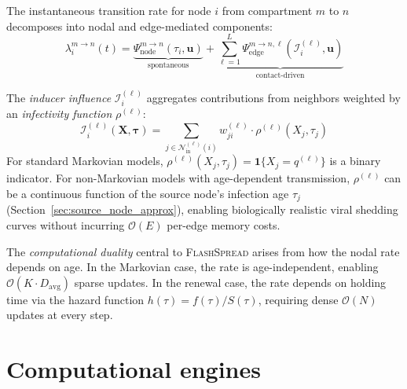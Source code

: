\documentclass[a4paper,fleqn]{cas-sc}
\theoremstyle{definition}
\theoremstyle{remark}
\newcommand{\flashspread}{\textsc{FlashSpread}}
\newcommand{\bigO}{\mathcal{O}}
\begin{document}
The instantaneous transition rate for node $i$ from compartment $m$ to $n$ decomposes into nodal and edge-mediated components:
\begin{equation}
    \lambda_{i}^{m \to n}(t) = \underbrace{\Psi_{\text{node}}^{m \to n}(\tau_i, \mathbf{u})}_{\text{spontaneous}} + \underbrace{\sum_{\ell=1}^{L} \Psi_{\text{edge}}^{m \to n, \ell}\left(\mathcal{I}_i^{(\ell)}, \mathbf{u}\right)}_{\text{contact-driven}}
    \label{eq:general_rate}
\end{equation}

The \emph{inducer influence} $\mathcal{I}_i^{(\ell)}$ aggregates contributions from neighbors weighted by an \emph{infectivity function} $\rho^{(\ell)}$:
\begin{equation}
    \mathcal{I}_i^{(\ell)}(\mathbf{X}, \bm{\tau}) = \sum_{j \in \mathcal{N}_{\text{in}}^{(\ell)}(i)} w_{ji}^{(\ell)} \cdot \rho^{(\ell)}(X_j, \tau_j)
    \label{eq:influence}
\end{equation}
For standard Markovian models, $\rho^{(\ell)}(X_j, \tau_j) = \mathbf{1}\{X_j = q^{(\ell)}\}$ is a binary indicator. For non-Markovian models with age-dependent transmission, $\rho^{(\ell)}$ can be a continuous function of the source node's infection age $\tau_j$ (Section~\ref{sec:source_node_approx}), enabling biologically realistic viral shedding curves without incurring $\bigO(E)$ per-edge memory costs.

The \emph{computational duality} central to \flashspread{} arises from how the nodal rate depends on age. In the Markovian case, the rate is age-independent, enabling $\bigO(K \cdot D_{\text{avg}})$ sparse updates. In the renewal case, the rate depends on holding time via the hazard function $h(\tau) = f(\tau)/S(\tau)$, requiring dense $\bigO(N)$ updates at every step.

\section{Computational engines}\label{sec:engines}
\end{document}
